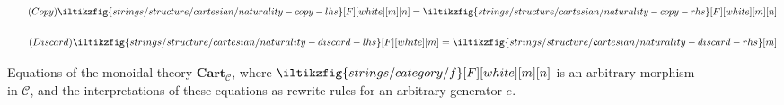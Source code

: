 \begin{figure}
    \centering
    \begin{minipage}{0.45\textwidth}
        \begin{equation}
            \tag{\(\mathsf{Copy}\)}
            \iltikzfig{strings/structure/cartesian/naturality-copy-lhs}[F][white][m][n]
            =
            \iltikzfig{strings/structure/cartesian/naturality-copy-rhs}[F][white][m][n]
            \label{eq:cartesian-copy}
        \end{equation}
    \end{minipage}
    \qquad
    \begin{minipage}{0.4\textwidth}
        \centering
        \begin{equation}
            \tag{\(\mathsf{Discard}\)}
            \iltikzfig{strings/structure/cartesian/naturality-discard-lhs}[F][white][m]
            =
            \iltikzfig{strings/structure/cartesian/naturality-discard-rhs}[m]
            \label{eq:cartesian-discard}
        \end{equation}
    \end{minipage}

    \begin{minipage}{0.45\textwidth}
        \begin{center}
            
        \end{center}
    \end{minipage}
    \begin{minipage}{0.4\textwidth}
        \begin{center}
            
        \end{center}
    \end{minipage}

    \caption{
        Equations of the monoidal theory \(\mathbf{Cart}_\mathcal{C}\),
        where \(\iltikzfig{strings/category/f}[F][white][m][n]\) is an arbitrary
        morphism in \(\mathcal{C}\), and the interpretations of these equations
        as rewrite rules for an arbitrary generator \(e\).
    }
    \label{fig:cartesian-equations}
\end{figure}